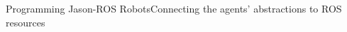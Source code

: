 \documentclass[compress]{beamer}
\begin{document}
\begin{frame}[fragile]{Programming Jason-ROS Robots}{Connecting the agents' abstractions to ROS resources}
\begin{columns}
\end{columns}



\end{frame}
\end{document}
